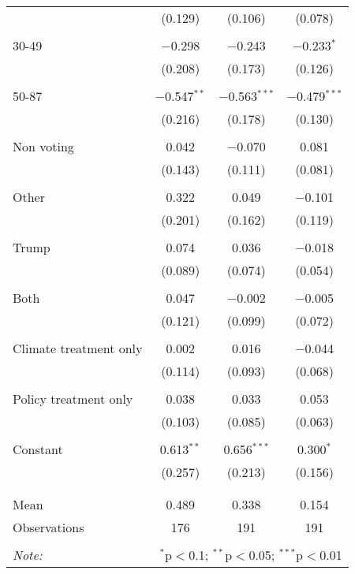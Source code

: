 \begin{tabular}{@{\extracolsep{5pt}}lccc}
  & (0.129) & (0.106) & (0.078) \\ 
  & & & \\ 
 30-49 & $-$0.298 & $-$0.243 & $-$0.233$^{*}$ \\ 
  & (0.208) & (0.173) & (0.126) \\ 
  & & & \\ 
 50-87 & $-$0.547$^{**}$ & $-$0.563$^{***}$ & $-$0.479$^{***}$ \\ 
  & (0.216) & (0.178) & (0.130) \\ 
  & & & \\ 
 Non voting & 0.042 & $-$0.070 & 0.081 \\ 
  & (0.143) & (0.111) & (0.081) \\ 
  & & & \\ 
 Other & 0.322 & 0.049 & $-$0.101 \\ 
  & (0.201) & (0.162) & (0.119) \\ 
  & & & \\ 
 Trump & 0.074 & 0.036 & $-$0.018 \\ 
  & (0.089) & (0.074) & (0.054) \\ 
  & & & \\ 
 Both & 0.047 & $-$0.002 & $-$0.005 \\ 
  & (0.121) & (0.099) & (0.072) \\ 
  & & & \\ 
 Climate treatment only & 0.002 & 0.016 & $-$0.044 \\ 
  & (0.114) & (0.093) & (0.068) \\ 
  & & & \\ 
 Policy treatment only & 0.038 & 0.033 & 0.053 \\ 
  & (0.103) & (0.085) & (0.063) \\ 
  & & & \\ 
 Constant & 0.613$^{**}$ & 0.656$^{***}$ & 0.300$^{*}$ \\ 
  & (0.257) & (0.213) & (0.156) \\ 
  & & & \\ 
\hline \\[-1.8ex] 
Mean & 0.489 & 0.338 & 0.154 \\ 
Observations & 176 & 191 & 191 \\ 
\hline 
\hline \\[-1.8ex] 
\textit{Note:}  & \multicolumn{3}{r}{$^{*}$p$<$0.1; $^{**}$p$<$0.05; $^{***}$p$<$0.01} \\ 
\end{tabular} 
